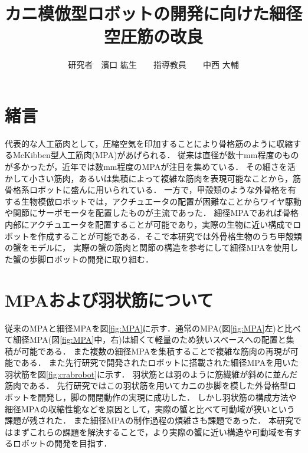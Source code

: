 \documentclass{jarticle}
\begin{document}

\title{
カニ模倣型ロボットの開発に向けた細径空圧筋の改良
}
\author{
研究者　濱口 紘生　　指導教員　　中西 大輔
}

\maketitle

\thispagestyle{empty}  %

\section{緒言}

代表的な人工筋肉として，圧縮空気を印加することにより骨格筋のように収縮するMcKibben型人工筋肉(MPA)があげられる．
従来は直径が数十mm程度のものが多かったが，近年では数mm程度のMPAが注目を集めている\cite{wakimoto}．
その細さを活かして小さい筋肉，あるいは集積によって複雑な筋肉を表現可能なことから，筋骨格系ロボットに盛んに用いられている\cite{wakimoto}．
一方で，甲殻類のような外骨格を有する生物模倣ロボットでは，アクチュエータの配置が困難なことからワイヤ駆動や関節にサーボモータを配置したものが主流であった\cite{crabrobot1}．
細径MPAであれば骨格内部にアクチュエータを配置することが可能であり，実際の生物に近い構成でロボットを作成することが可能である．そこで本研究では外骨格生物のうち甲殻類の蟹をモデルに，
実際の蟹の筋肉と関節の構造を参考にして細径MPAを使用した蟹の歩脚ロボットの開発に取り組む．

\vspace*{-2mm}
\section{MPAおよび羽状筋について}

従来のMPAと細径MPAを図\ref{fig:MPA}に示す．通常のMPA(図\ref{fig:MPA}左)と比べて細径MPA(図\ref{fig:MPA}中，右)は細くて軽量のため狭いスペースへの配置と集積が可能である．
また複数の細径MPAを集積することで複雑な筋肉の再現が可能である．
また先行研究\cite{crabrobot2}で開発されたロボットに搭載された細径MPAを用いた羽状筋を図\ref{fig:crabrobot}に示す．
羽状筋とは羽のように筋繊維が斜めに並んだ筋肉である．
先行研究\cite{crabrobot2}ではこの羽状筋を用いてカニの歩脚を模した外骨格型ロボットを開発し，脚の開閉動作の実現に成功した．
しかし羽状筋の構成方法や細径MPAの収縮性能などを原因として，実際の蟹と比べて可動域が狭いという課題が残された．
また細径MPAの制作過程の煩雑さも課題であった．
本研究ではまずこれらの課題を解決することで，より実際の蟹に近い構造や可動域を有するロボットの開発を目指す．
\end{document}
